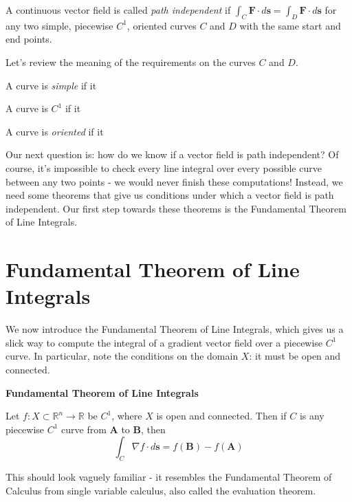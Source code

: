 \documentclass{ximera}
\begin{document}
\begin{definition}
A continuous vector field is called \emph{path independent} if $\int_C \textbf{F}\cdot d\textbf{s}=\int_D \textbf{F}\cdot d\textbf{s}$ for any two simple, piecewise $C^1$, oriented curves $C$ and $D$ with the same start and end points.
\end{definition}

Let's review the meaning of the requirements on the curves $C$ and $D$.

A curve is \emph{simple} if it 

A curve is $C^1$ if it 

A curve is \emph{oriented} if it 

Our next question is: how do we know if a vector field is path independent? Of course, it's impossible to check every line integral over every possible curve between any two points - we would never finish these computations! Instead, we need some theorems that give us conditions under which a vector field is path independent. Our first step towards these theorems is the Fundamental Theorem of Line Integrals.

\section*{Fundamental Theorem of Line Integrals}

We now introduce the Fundamental Theorem of Line Integrals, which gives us a slick way to compute the integral of a gradient vector field over a piecewise $C^1$ curve. In particular, note the conditions on the domain $X$: it must be open and connected.

\begin{theorem}
\textbf{Fundamental Theorem of Line Integrals}

Let $f:X\subset \mathbb{R}^n\rightarrow \mathbb{R}$ be $C^1$, where $X$ is open and connected. Then if $C$ is any piecewise $C^1$ curve from $\textbf{A}$ to $\textbf{B}$, then
\[
\int_C\nabla f\cdot d\textbf{s} = f(\textbf{B})-f(\textbf{A})
\]
\end{theorem}

This should look vaguely familiar - it resembles the Fundamental Theorem of Calculus from single variable calculus, also called the evaluation theorem.
\end{document}
